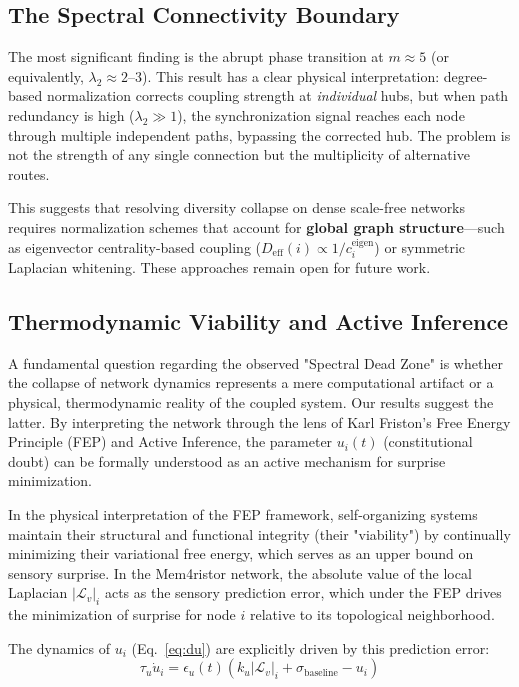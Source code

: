 \documentclass[11pt]{article}
\begin{document}
\subsection{The Spectral Connectivity Boundary}

The most significant finding is the abrupt phase transition at $m \approx 5$ (or equivalently, $\lambda_2 \approx 2$--$3$). This result has a clear physical interpretation: degree-based normalization corrects coupling strength at \emph{individual} hubs, but when path redundancy is high ($\lambda_2 \gg 1$), the synchronization signal reaches each node through multiple independent paths, bypassing the corrected hub. The problem is not the strength of any single connection but the multiplicity of alternative routes.

This suggests that resolving diversity collapse on dense scale-free networks requires normalization schemes that account for \textbf{global graph structure}---such as eigenvector centrality-based coupling ($D_{\text{eff}}(i) \propto 1/c_i^{\text{eigen}}$) or symmetric Laplacian whitening. These approaches remain open for future work.

\subsection{Thermodynamic Viability and Active Inference}

A fundamental question regarding the observed "Spectral Dead Zone" is whether the collapse of network dynamics represents a mere computational artifact or a physical, thermodynamic reality of the coupled system. Our results suggest the latter. By interpreting the network through the lens of Karl Friston's Free Energy Principle (FEP) and Active Inference, the parameter $u_i(t)$ (constitutional doubt) can be formally understood as an active mechanism for surprise minimization.

In the physical interpretation of the FEP framework, self-organizing systems maintain their structural and functional integrity (their "viability") by continually minimizing their variational free energy, which serves as an upper bound on sensory surprise. In the Mem4ristor network, the absolute value of the local Laplacian $|\mathcal{L}_v|_i$ acts as the sensory prediction error, which under the FEP drives the minimization of surprise for node $i$ relative to its topological neighborhood.

The dynamics of $u_i$ (Eq.~\ref{eq:du}) are explicitly driven by this prediction error:
\begin{equation*}
\tau_u \dot{u}_i = \epsilon_u(t) \left( k_u |\mathcal{L}_v|_i + \sigma_{\text{baseline}} - u_i \right)
\end{equation*}
\end{document}

